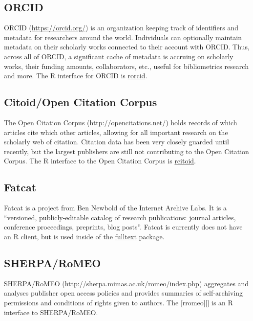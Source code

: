 \documentclass[author-year, review, 11pt]{components/elsarticle} %
\begin{document}
\hypertarget{orcid}{%
\subsection{ORCID}\label{orcid}}

ORCID (\url{https://orcid.org/}) is an organization keeping track of
identifiers and metadata for researchers around the world. Individuals
can optionally maintain metadata on their scholarly works connected to
their account with ORCID. Thus, across all of ORCID, a significant cache
of metadata is accruing on scholarly works, their funding amounts,
collaborators, etc., useful for bibliometrics research and more. The R
interface for ORCID is
\href{https://github.com/ropensci/rorcid}{rorcid}.

\hypertarget{citoidopen-citation-corpus}{%
\subsection{Citoid/Open Citation
Corpus}\label{citoidopen-citation-corpus}}

The Open Citation Corpus (\url{http://opencitations.net/}) holds records
of which articles cite which other articles, allowing for all important
research on the scholarly web of citation. Citation data has been very
closely guarded until recently, but the largest publishers are still not
contributing to the Open Citation Corpus. The R interface to the Open
Citation Corpus is
\href{https://github.com/ropenscilabs/rcitoid}{rcitoid}.

\hypertarget{fatcat}{%
\subsection{Fatcat}\label{fatcat}}

Fatcat is a project from Ben Newbold of the Internet Archive Labs. It is
a ``versioned, publicly-editable catalog of research publications:
journal articles, conference proceedings, preprints, blog posts''.
Fatcat is currently does not have an R client, but is used inside of the
\href{https://github.com/ropensci/fulltext}{fulltext} package.

\hypertarget{sherparomeo}{%
\subsection{SHERPA/RoMEO}\label{sherparomeo}}

SHERPA/RoMEO (\url{http://sherpa.mimas.ac.uk/romeo/index.php})
aggregates and analyses publisher open access policies and provides
summaries of self-archiving permissions and conditions of rights given
to authors. The {[}rromeo{]}{[}{]} is an R interface to SHERPA/RoMEO.
\end{document}
